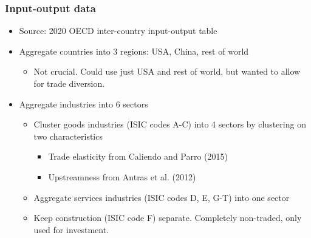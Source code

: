 \documentclass[aspectratio=169,t,10pt,table]{beamer}
\begin{document}
\begin{frame}
  \frametitle{Input-output data}
  \begin{itemize}\addtolength{\itemsep}{1ex}
    \item Source: 2020 OECD inter-country input-output table
    \item Aggregate countries into 3 regions: USA, China, rest of world
    \begin{itemize}
        \item Not crucial. Could use just USA and rest of world, but wanted to allow for trade diversion.
    \end{itemize}
    \item Aggregate industries into 6 sectors
        \vspace{0.05cm}
    \begin{itemize}\addtolength{\itemsep}{0.75ex}
    \item Cluster goods industries (ISIC codes A-C) into 4 sectors by clustering on two characteristics
    \vspace{0.05cm}
    \begin{itemize}\addtolength{\itemsep}{0.5ex}
        \item Trade elasticity from Caliendo and Parro (2015)
        \item Upstreamness from Antras et al. (2012)
    \end{itemize}
    \item Aggregate services industries (ISIC codes D, E, G-T) into one sector
    \item Keep construction (ISIC code F) separate. Completely non-traded, only used for investment.
   \end{itemize}
    \end{itemize}
\end{frame}
\end{document}
